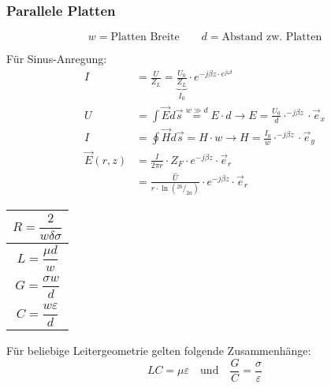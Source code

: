 \subsubsection{Parallele Platten}
{\small\[
        w  = \text{Platten Breite} \qquad d  = \text{Abstand zw. Platten}
    \]}

Für Sinus-Anregung:
\begin{align*}
    I             & = \frac{U}{Z_L} = \underbrace{\frac{U_0}{Z_L}}_{I_0}\cdot e^{-j\beta z\cdot e^{j\omega t}}                         \\
    U             & = \int \vec{E} d\vec{s} \stackrel{w\gg d}{=} E\cdot d \rightarrow E = \frac{U_0}{d}\cdot^{-j\beta z}\cdot\vec{e}_x \\
    I             & = \oint \vec{H} d\vec{s} =  H\cdot w \rightarrow H = \frac{I_0}{w}\cdot^{-j\beta z}\cdot\vec{e}_y                  \\
    \vec{E}(r, z) & = \frac{I}{2\pi r}\cdot Z_F\cdot e^{-j\beta z} \cdot\vec{e}_r                                                      \\
                  & = \frac{\hat{U}}{r \cdot\ln{(^{2b}/_{2a})}}\cdot e^{-j\beta z}\cdot\vec{e}_r
\end{align*}


{\renewcommand*{\arraystretch}{0.2}
    \begin{tabularx}{0.5\columnwidth}{|X|}
        \hline
        \[R=\frac{2}{w\delta\sigma}\] \\
        \hline
        \[L=\frac{\mu d}{w}\]         \\
        \hline
        \[G=\frac{\sigma w}{d}\]      \\
        \hline
        \[C=\frac{w\varepsilon}{d}\]  \\
        \hline
    \end{tabularx}
}

\vspace{1ex}
Für beliebige Leitergeometrie gelten folgende Zusammenhänge:
\[
    LC = \mu\varepsilon \quad \text{und} \quad \frac{G}{C} = \frac{\sigma}{\varepsilon}
\]
\textbf{\color{red}{Leitungen gehen HIN und ZURÜCK!!!}\\
    \color{red}{Länge verdoppeln!!!}
}
